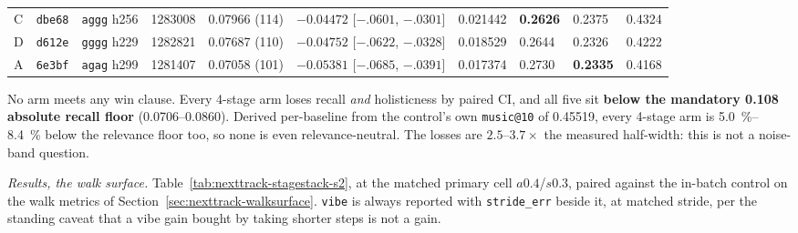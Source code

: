 \documentclass[11pt]{article}
\newcommand{\best}[1]{\textbf{#1}}
\begin{document}
\begin{table}[ht]
{\begin{tabular}{lllrllllll}
    C & \texttt{dbe68} & \texttt{aggg} h256 & \num{1283008} & 0.07966 (114) & $-0.04472$ [$-.0601$, $-.0301$] & 0.021442 & \best{0.2626} & 0.2375 & 0.4324 \\
    D & \texttt{d612e} & \texttt{gggg} h229 & \num{1282821} & 0.07687 (110) & $-0.04752$ [$-.0622$, $-.0328$] & 0.018529 & 0.2644 & 0.2326 & 0.4222 \\
    A & \texttt{6e3bf} & \texttt{agag} h299 & \num{1281407} & 0.07058 (101) & $-0.05381$ [$-.0685$, $-.0391$] & 0.017374 & 0.2730 & \best{0.2335} & 0.4168 \\
    \bottomrule
  \end{tabular}}
\end{table}

No arm meets any win clause. Every 4-stage arm loses recall \emph{and}
holisticness by paired CI, and all five sit \textbf{below the mandatory
\num{0.108} absolute recall floor} (\numrange{0.0706}{0.0860}). Derived
per-baseline from the control's own \texttt{music@10} of \num{0.45519}, every
4-stage arm is \SIrange{5.0}{8.4}{\percent} below the relevance floor too, so none
is even relevance-neutral. The losses are $\numrange{2.5}{3.7}\times$ the measured
half-width: this is not a noise-band question.

\emph{Results, the walk surface.} Table~\ref{tab:nexttrack-stagestack-s2}, at the matched
primary cell $a\num{0.4}$/$s\num{0.3}$, paired against the in-batch control on the
walk metrics of Section~\ref{sec:nexttrack-walksurface}. \texttt{vibe} is always reported with
\texttt{stride\_err} beside it, at matched stride, per the standing caveat that a
vibe gain bought by taking shorter steps is not a gain.
\end{document}
